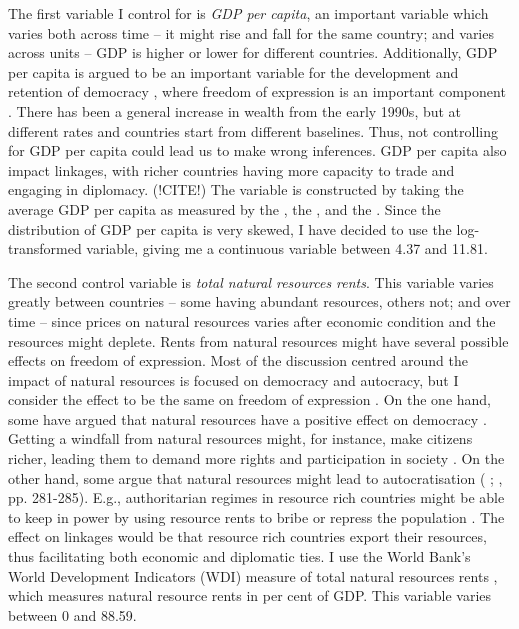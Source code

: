 The first variable I control for is \textit{GDP per capita}, an important variable which varies both across time -- it might rise and fall for the same country; and varies across units -- GDP is higher or lower for different countries. Additionally, GDP per capita is argued to be an important variable for the development and retention of democracy \citep{lipset_social_1959, przeworski_modernization_1997}, where freedom of expression is an important component \citep[p. 71]{lipset_social_1959}. There has been a general increase in wealth from the early 1990s, but at different rates and countries start from different baselines. Thus, not controlling for GDP per capita could lead us to make wrong inferences. GDP per capita also impact linkages, with richer countries having more capacity to trade and engaging in diplomacy. (!CITE!) The variable is constructed by taking the average GDP per capita as measured by the \citet{world_bank_world_2025}, the \citet{imf_world_2025}, and the \citet{united_nations_statistics_division_national_2025}. Since the distribution of GDP per capita is very skewed, I have decided to use the log-transformed variable, giving me a continuous variable between 4.37 and 11.81. 

The second control variable is \textit{total natural resources rents}. This variable varies greatly between countries -- some having abundant resources, others not; and over time -- since prices on natural resources varies after economic condition and the resources might deplete. Rents from natural resources might have several possible effects on freedom of expression. Most of the discussion centred around the impact of natural resources is focused on democracy and autocracy, but I consider the effect to be the same on freedom of expression \citep{lipset_social_1959}. On the one hand, some have argued that natural resources have a positive effect on democracy \citep{brooks_oil_2016, haber_natural_2011}. Getting a windfall from natural resources might, for instance, make citizens richer, leading them to demand more rights and participation in society \citep{brooks_oil_2016, lipset_social_1959}. On the other hand, some argue that natural resources might lead to autocratisation (\citeauthor{andersen_big_2014} \citeyear{andersen_big_2014}; \citeauthor{brooks_oil_2016} \citeyear{brooks_oil_2016}, pp. 281-285). E.g., authoritarian regimes in resource rich countries might be able to keep in power by using resource rents to bribe or repress the population \citep[p. 282]{brooks_oil_2016}. The effect on linkages would be that resource rich countries export their resources, thus facilitating both economic and diplomatic ties. I use the World Bank's World Development Indicators (WDI) measure of total natural resources rents \citep{world_bank_world_2025}, which measures natural resource rents in per cent of GDP. This variable varies between 0 and 88.59. 

